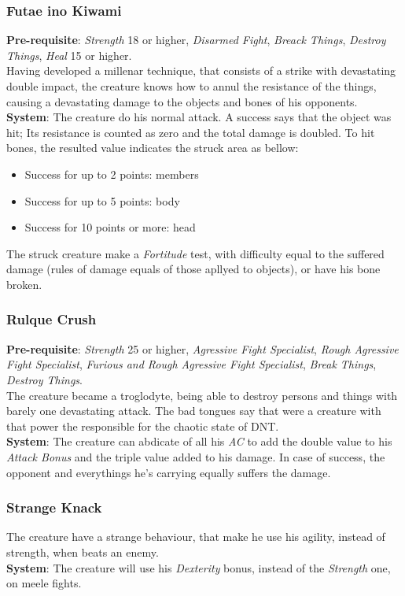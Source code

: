 \documentclass[ letterpaper,12pt]{article}
\begin{document}
\subsubsection{Futae ino Kiwami}
{\bf Pre-requisite}: {\it Strength} 18 or higher, {\it Disarmed Fight}, {\it Breack Things}, {\it Destroy Things}, {\it Heal} 15 or higher.\\
Having developed a millenar technique, that consists of a strike with devastating double impact, the creature knows how to annul the resistance of the things, causing a devastating damage to the objects and bones of his opponents.\\
{\bf System}: The creature do his normal attack. A success says that the object was hit; Its resistance is counted as zero and the total damage is doubled. To hit bones, the resulted value indicates the struck area as bellow:\\
\begin{itemize}
\item{Success for up to 2 points: members}
\item{Success for up to 5 points: body}
\item{Success for 10 points or more: head}
\end{itemize}
The struck creature make a {\it Fortitude} test, with difficulty equal to the suffered damage (rules of damage equals of those apllyed to objects), or have his bone broken.

\subsubsection{Rulque Crush}
{\bf Pre-requisite}: {\it Strength} 25 or higher, {\it Agressive Fight Specialist}, {\it Rough Agressive Fight Specialist}, {\it Furious and Rough Agressive Fight Specialist}, {\it Break Things}, {\it Destroy Things}.\\
The creature became a troglodyte, being able to destroy persons and things with barely one devastating attack. The bad tongues say that were a creature with that power the responsible for the chaotic state of DNT.\\
{\bf System}: The creature can abdicate of all his {\it AC} to add the double value to his {\it Attack Bonus} and the triple value added to his damage. In case of success, the opponent and everythings he's carrying equally suffers the damage.

\subsubsection{Strange Knack}
The creature have a strange behaviour, that make he use his agility, instead of strength, when beats an enemy.\\
{\bf System}: The creature will use his {\it Dexterity} bonus, instead of the {\it Strength} one, on meele fights.\\
\end{document}

